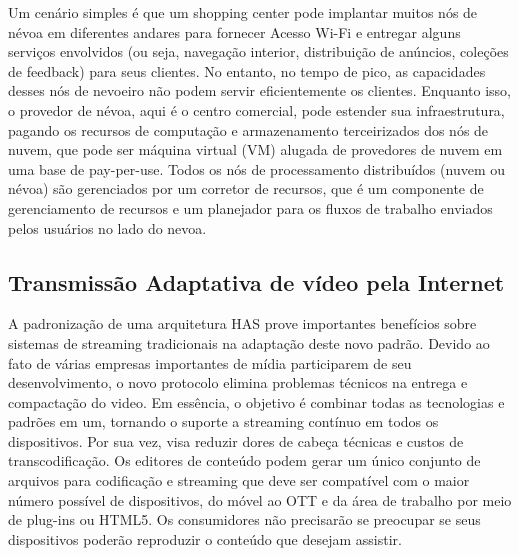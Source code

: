 Um cenário simples é que um shopping center pode implantar muitos nós de névoa em diferentes andares para fornecer Acesso Wi-Fi e entregar alguns serviços envolvidos (ou seja, navegação interior, distribuição de anúncios, coleções de feedback) para seus clientes. No entanto, no tempo de pico, as capacidades desses nós de nevoeiro não podem servir eficientemente os clientes. Enquanto isso, o provedor de névoa, aqui é o centro comercial, pode estender sua infraestrutura, pagando os recursos de computação e armazenamento terceirizados dos nós de nuvem, que pode ser máquina virtual (VM) alugada de provedores de nuvem em uma base de pay-per-use. Todos os nós de processamento distribuídos (nuvem ou névoa) são gerenciados por um corretor de recursos, que é um componente de gerenciamento de recursos e um planejador para os fluxos de trabalho enviados pelos usuários no lado do nevoa. 

\subsection{Transmissão Adaptativa de vídeo pela Internet}
\label{sec:has-dash}

A padronização de uma arquitetura HAS prove importantes benefícios sobre sistemas de streaming tradicionais na adaptação deste novo padrão. Devido ao fato de várias empresas importantes de mídia participarem de seu desenvolvimento, o novo protocolo elimina problemas técnicos na entrega e compactação do video. Em essência, o objetivo é combinar todas as tecnologias e padrões em um, tornando o suporte a streaming contínuo em todos os dispositivos. Por sua vez, visa reduzir dores de cabeça técnicas e custos de transcodificação. Os editores de conteúdo podem gerar um único conjunto de arquivos para codificação e streaming que deve ser compatível com o maior número possível de dispositivos, do móvel ao OTT e da área de trabalho por meio de plug-ins ou HTML5. Os consumidores não precisarão se preocupar se seus dispositivos poderão reproduzir o conteúdo que desejam assistir.

